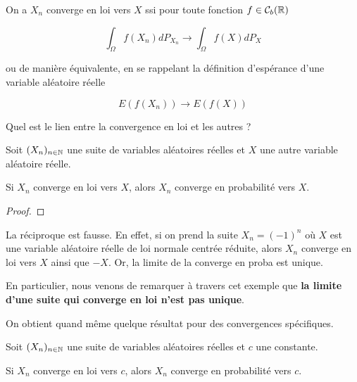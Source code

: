 \begin{remarque}
	On a $X_{n}$ converge en loi vers $X$ ssi pour toute fonction $f \in
	\mathcal{C}_{b} (\mathbb{R})$

	\begin{equation}
		\int_{\Omega} f(X_{n}) dP_{X_{n}} \rightarrow \int_{\Omega} f(X) dP_{X}
	\end{equation}

	ou de manière équivalente, en se rappelant la définition d'espérance d'une
	variable aléatoire réelle

	\begin{equation}
		E(f(X_{n})) \rightarrow E(f(X))
	\end{equation}
\end{remarque}

Quel est le lien entre la convergence en loi et les autres ?

\begin{proposition}
	Soit $(X_{n})_{n \in \mathbb{N}}$ une suite de variables aléatoires réelles et
	$X$ une autre variable aléatoire réelle.

	Si $X_{n}$ converge en loi vers $X$, alors $X_{n}$ converge en probabilité
	vers $X$.
\end{proposition}

\ifdefined\outputproof
\begin{proof}

\end{proof}
\fi

\begin{remarque}
	La réciproque est fausse. En effet, si on prend la suite $X_{n} = (-1)^{n}$
	où $X$ est une variable aléatoire réelle de loi normale centrée réduite,
	alors $X_{n}$ converge en loi vers $X$ ainsi que $-X$. Or, la limite de la
	converge en proba est unique.

	En particulier, nous venons de remarquer à travers cet exemple que
	\textbf{la limite d'une suite qui converge en loi n'est pas unique}.
\end{remarque}

On obtient quand même quelque résultat pour des convergences spécifiques.

\begin{proposition}
	Soit $(X_{n})_{n \in \mathbb{N}}$ une suite de variables aléatoires réelles et
	$c$ une constante.

	Si $X_{n}$ converge en loi vers $c$, alors $X_{n}$ converge en probabilité
	vers $c$.
\end{proposition}

